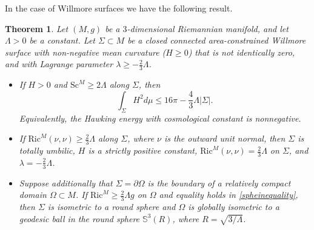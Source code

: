 \documentclass[12pt,a4paper]{amsart}
\theoremstyle{plain}
\newtheorem{theorem}{Theorem}[section]
\theoremstyle{definition}
\begin{document}
In the case of Willmore surfaces we have the following result.
\begin{theorem}\label{positivecosmo}
Let $(M,g)$ be a $3$-dimensional Riemannian manifold, and let $\Lambda > 0$ be a constant. Let $\Sigma \subset M$ be a closed connected area-constrained Willmore surface with non-negative mean curvature ($H \ge 0$) that is not identically zero, and with Lagrange parameter $\lambda \ge -\frac{2}{3}\Lambda$. 
\begin{itemize}
     \item[(i)] If $H>0$ and $\mathrm{Sc}^M\ge 2\Lambda$ along $\Sigma$, then \begin{equation}\label{spheinequality}
        \int_\Sigma H^2 d\mu \le 16\pi - \frac{4}{3}\Lambda|\Sigma|.
    \end{equation}
    Equivalently, the Hawking energy with cosmological constant is nonnegative. 
     
     \item[(ii)] If $ \mathrm{Ric}^M(\nu,\nu)\ge \frac23\Lambda$ along $\Sigma$, where $\nu$ is the outward unit normal, then $\Sigma$ is totally umbilic, $H$ is a strictly positive constant, $ \mathrm{Ric}^M(\nu,\nu)=\frac23\Lambda$ on $\Sigma$,  and $\lambda=-\frac23\Lambda$.
    
    \item[(iii)] Suppose additionally  that $\Sigma=\partial\Omega$ is the boundary of a relatively compact domain $\Omega\subset M$. If $\mathrm{Ric}^M \ge \frac{2}{3}\Lambda g$ on $\Omega$ and equality holds in \eqref{spheinequality}, then $\Sigma$ is isometric to a round sphere and $\Omega$ is globally isometric to a  geodesic ball in the round sphere $\mathbb{S}^3(R)$, where $R = \sqrt{3/\Lambda}$.
\end{itemize}
\end{theorem}
\end{document}

